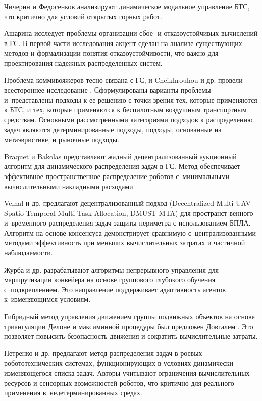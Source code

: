 Чичерин и Федосенков \cite{ChicherinFedosenkov2021} анализируют динамическое модальное управление БТС, что критично для условий открытых горных работ.

Ашарина \cite{Asharina2021_1} исследует проблемы организации сбое- и отказоустойчивых вычислений в ГС. В первой части исследования акцент сделан на анализе существующих методов и формализации понятия отказоустойчивости, что важно для проектирования надежных распределенных систем.

Проблема коммивояжеров тесно связана с ГС, и Cheikhrouhou и др. провели всестороннее исследование \cite{cheikhrouhou2021comprehensive}. Сформулированы варианты проблемы и~представлены подходы к ее решению с точки зрения тех, которые применяются к БТС, и тех, которые применяются к беспилотным воздушным транспортным средствам. Основными рассмотренными категориями подходов к распределению задач являются детерминированные подходы, подходы, основанные на метаэвристике, и рыночные подходы.

Braquet и Bakolas \cite{braquet2021greedydecentralizedauctionbasedtask} представляют жадный децентрализованный аукционный алгоритм для динамического распределения задач в ГС. Метод обеспечивает эффективное пространственное распределение роботов с~минимальными вычислительными накладными расходами.

Velhal и др. \cite{velhal2021decentralizedmultiuavspatiotemporalmultitask} предлагают децентрализованный подход (Decentralized Multi-UAV Spatio-Temporal Multi-Task Allocation, DMUST-MTA) для пространст-венного и~временного распределения задач защиты периметра с использованием БПЛА. Алгоритм на основе консенсуса демонстрирует сравнимую с~централизованными методами эффективность при меньших вычислительных затратах и частичной наблюдаемости.

Журба и др. \cite{ZhurbaFilchenkovAzarovShalito2022} разрабатывают алгоритмы непрерывного управления для маршрутизации конвейера на основе группового глубокого обучения с~подкреплением. Это направление поддерживает адаптивность агентов к~изменяющимся условиям.

Гибридный метод управления движением группы подвижных объектов на основе триангуляции Делоне и максиминной процедуры был предложен Довгалем \cite{Dovgal2022}. Это позволяет повысить безопасность движения и сократить вычислительные затраты.

Петренко и др. \cite{PetrenkoTrebuevaPavlovGurchincskiy2022} предлагают метод распределения задач в роевых робототехнических системах, функционирующих в условиях динамически изменяющегося списка задач. Авторы учитывают ограничения вычислительных ресурсов и сенсорных возможностей роботов, что критично для реального применения в~недетерминированных средах.

